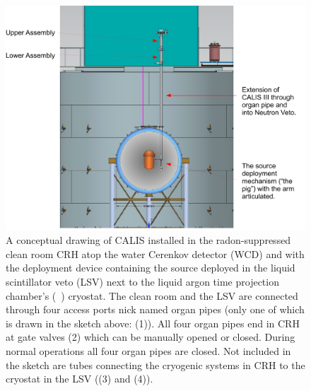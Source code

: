\begin{figure}[htbp]
 \centering
\includegraphics[width=\textwidth]{Figures/wholeAssembly_insideDetectors}
\caption{A conceptual drawing of CALIS installed in the radon-suppressed clean room CRH atop the water Cerenkov detector (WCD) and with the deployment device containing the source  %
deployed in the liquid scintillator veto (LSV) next to the liquid argon time projection chamber's (\lar\ \tpc) cryostat. The clean room and the LSV are connected through four %
access ports nick named organ pipes (only one of which is drawn in the sketch above: (1)). All four organ pipes end in CRH at gate valves (2) which can be manually opened or closed. During normal operations all four organ pipes are closed. Not included in the sketch are tubes connecting the cryogenic systems in CRH to the cryostat in the LSV ((3) and (4)).\label{fig:wholeAssembly_insideDetectors}}
\end{figure}

